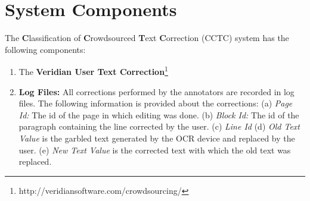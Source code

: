 \documentclass{acm_proc_article-sp}
\begin{document}
\section{System Components}
\label{components}
The \textbf{C}lassification of \textbf{C}rowdsourced \textbf{T}ext \textbf{C}orrection (CCTC) system has the following components:
\begin{enumerate}
\item The \textbf{Veridian User Text Correction}\footnote{http://veridiansoftware.com/crowdsourcing/} %
\item \textbf{Log Files: }All corrections performed by the annotators are recorded in log files.
The following information is provided about the corrections:
(a) \textit{Page Id: } The id of the page in which editing was done.
(b) \textit{Block Id: } The id of the paragraph containing the line corrected by the user.
(c) \textit{Line Id }
(d) \textit{Old Text Value} is the garbled text generated by the OCR device and replaced by the user.
(e) \textit{New Text Value} is the corrected text with which the old text was replaced.


\end{enumerate}
\end{document}
